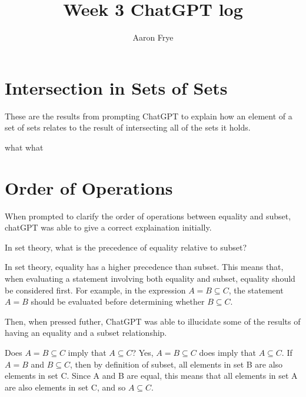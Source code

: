 \documentclass{article}
\title{Week 3 ChatGPT log}
\author{Aaron Frye}
\begin{document}
\section{Intersection in Sets of Sets}

These are the results from prompting ChatGPT to explain how an element
of a set of sets relates to the result of intersecting all of the sets it holds.

\begin{dialogue}
     what
     what
\end{dialogue}

\section{Order of Operations}

When prompted to clarify the order of operations between equality and subset,
chatGPT was able to give a correct explaination initially.

\begin{dialogue}
     In set theory, what is the precedence of equality relative to subset?

     In set theory, equality has a higher precedence than subset. 
        This means that, when evaluating a statement involving both equality and subset, equality should be considered first. 
        For example, in the expression $A = B \subseteq C$, the statement $A = B$ should be evaluated before determining whether $B \subseteq C$.
\end{dialogue}

Then, when pressed futher, ChatGPT was able to illucidate some of the results of 
having an equality and a subset relationship.

\begin{dialogue}
     Does $A = B \subseteq C$ imply that $A \subseteq C$?
     Yes, $A = B \subseteq C$ does imply that $A \subseteq C$. If $A = B$ and $B \subseteq C$, then by definition of subset, 
        all elements in set B are also elements in set C. Since A and B are equal, this means that all elements in set A are also elements in set C, 
        and so $A \subseteq C$.
\end{dialogue}
\end{document}
